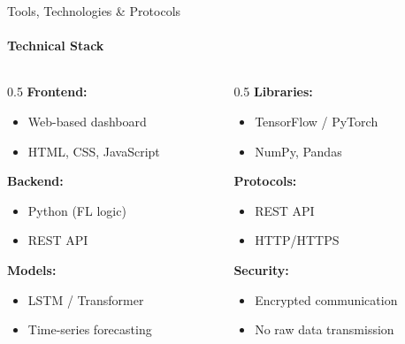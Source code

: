 \documentclass[aspectratio=169, 11pt]{beamer}
\begin{document}
\begin{frame}{Tools, Technologies \& Protocols}
    \framesubtitle{Technical Stack}

    \begin{columns}
        \begin{column}{0.5\textwidth}
            \textbf{Frontend:}
            \begin{itemize}
                \item Web-based dashboard
                \item HTML, CSS, JavaScript
            \end{itemize}

            \vspace{0.3cm}
            \textbf{Backend:}
            \begin{itemize}
                \item Python (FL logic)
                \item REST API
            \end{itemize}

            \vspace{0.3cm}
            \textbf{Models:}
            \begin{itemize}
                \item LSTM / Transformer
                \item Time-series forecasting
            \end{itemize}
        \end{column}

        \begin{column}{0.5\textwidth}
            \textbf{Libraries:}
            \begin{itemize}
                \item TensorFlow / PyTorch
                \item NumPy, Pandas
            \end{itemize}

            \vspace{0.3cm}
            \textbf{Protocols:}
            \begin{itemize}
                \item REST API
                \item HTTP/HTTPS
            \end{itemize}

            \vspace{0.3cm}
            \textbf{Security:}
            \begin{itemize}
                \item Encrypted communication
                \item No raw data transmission
            \end{itemize}
        \end{column}
    \end{columns}
\end{frame}
\end{document}
